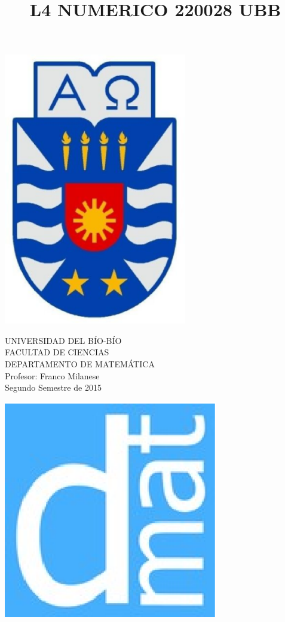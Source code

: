 \documentclass[11pt]{article}
\begin{document}
\title{L4 NUMERICO 220028 UBB}

{\begin{minipage}{2cm}
\hspace*{1cm}\includegraphics[width=0.6\textwidth]{escubo-ubb.eps}
\end{minipage}
\begin{minipage}{12cm}
\small
{\bf \rm 
{
\begin{center}
{\footnotesize UNIVERSIDAD DEL B\'IO-B\'IO} \\
{\scriptsize FACULTAD DE CIENCIAS}  \\
{\scriptsize DEPARTAMENTO DE MATEM\'ATICA}  \\
{\scriptsize Profesor:  Franco Milanese}\\
{\scriptsize Segundo Semestre de 2015}
\end{center}
}}
\end{minipage}}
{\begin{minipage}{2cm}
\hspace*{-0.5cm}\vspace*{-0.05cm}\includegraphics[width=0.7\textwidth]{escudo-dmat.eps}
\end{minipage}}
\end{document}

